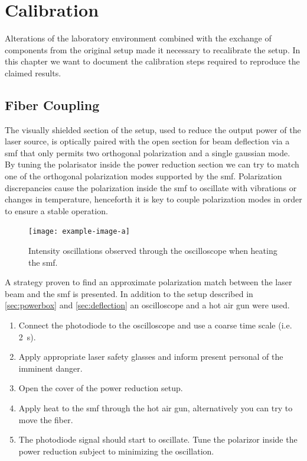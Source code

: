 \chapter{Calibration}

Alterations of the laboratory environment combined with the exchange of
components from the original setup made it necessary to recalibrate the setup.
In this chapter we want to document the calibration steps required to
reproduce the claimed results.

\section{Fiber Coupling}

The visually shielded section of the setup, used to reduce the output power
of the laser source, is optically paired with the open section for beam
deflection via a \gls{smf} that only permits two orthogonal polarization and
a single gaussian mode. By tuning the polarisator inside the power
reduction section we can try to match one of the orthogonal polarization
modes supported by the \gls{smf}. Polarization discrepancies cause the
polarization inside the \gls{smf} to oscillate with vibrations or changes in
temperature, henceforth it is key to couple polarization modes in order to
ensure a stable operation.

\begin{figure}[h]
  \centering
  \texttt{[image: example-image-a]}
  \caption{Intensity oscillations observed through the oscilloscope when
  heating the \gls{smf}.}
  \label{fig:fibercoup}
\end{figure}

A strategy proven to find an approximate polarization match between the
laser beam and the \gls{smf} is presented. In addition to the setup described
in \cref{sec:powerbox} and \cref{sec:deflection} an oscilloscope and a hot
air gun were used.

\begin{enumerate}
  \item Connect the photodiode to the oscilloscope and use a coarse time
    scale (i.e. \SI{2}{\second}).
  \item Apply appropriate laser safety glasses and inform present personal
    of the imminent danger.
  \item Open the cover of the power reduction setup.
  \item Apply heat to the \gls{smf} through the hot air gun, alternatively
    you can try to move the fiber.
  \item The photodiode signal should start to oscillate. Tune the polarizor
    inside the power reduction subject to minimizing the oscillation.
\end{enumerate}


